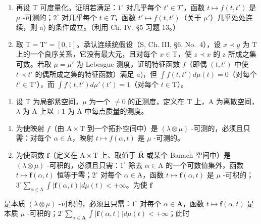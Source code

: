 \begin{enumerate}
\def\labelenumi{\alph{enumi})}
\setcounter{enumi}{1}
\item
  再设 T 可度量化。证明若满足：\(1^{\circ}\) 对几乎每个 \(t' \in T'\)，函数 \(t \mapsto f(t, t')\) 是 \(\mu\) -可测的；\(2^{\circ}\) 对几乎每个 \(t \in T\)，函数 \(t' \mapsto f(t, t')\)（关于 \(\mu'\)）几乎处处连续，则 a) 的条件成立。（利用 Ch. IV, §5 习题 13。）
\item
  取 \(\mathrm{T} = \mathrm{T}' = [0,1]\)。承认连续统假设（S, Ch. III, §6, No.~4），设 \(x \prec y\) 为 \(\mathrm{T}\) 上的一个良序关系，它没有最大元，且对每个 \(x \in \mathrm{T}\)，使 \(z \prec x\) 的 z 所成之集可数。若取 \(\mu = \mu'\) 为 Lebesgue 测度，证明特征函数 \(f\)（即偶 \((t, t')\) 中使 \(t \prec t'\) 的偶所成之集的特征函数）满足 \(a\))，但 \(\int f(t, t') d\mu(t) = 0\)（对每个 \(t' \in \mathrm{T}'\)），而 \(\int f(t, t') d\mu'(t') = 1\)（对每个 \(t \in \mathrm{T}\)）。
\end{enumerate}

\begin{enumerate}
\def\labelenumi{\arabic{enumi})}
\setcounter{enumi}{7}
\tightlist
\item
  设 \(\mathrm{T}\) 为局部紧空间，\(\mu\) 为一个 \(\neq 0\) 的正测度，定义在 \(\mathrm{T}\) 上，A 为离散空间，\(\lambda\) 为 \(\mathrm{A}\) 上以 \(+1\) 为 \(\mathrm{A}\) 中每点质量的测度。
\end{enumerate}

\begin{enumerate}
\def\labelenumi{\alph{enumi})}
\item
  为使映射 \(f\)（由 \(\mathrm{A} \times \mathrm{T}\) 到一个拓扑空间中）是 \((\lambda \otimes \mu)\) -可测的，必须且只需：对每个 \(\alpha \in \mathrm{A}\)，映射 \(t \mapsto f(\alpha, t)\) 是 \(\mu\) -可测的。
\item
  为使函数 \(\mathbf{f}\)（定义在 \(\mathrm{A} \times \mathrm{T}\) 上、取值于 \(\overline{\mathbf{R}}\) 或某个 Banach 空间中）是 \((\lambda \otimes \mu)\) -可积的，必须且只需：\(1^{\circ}\) 除去 \(\alpha \in \mathrm{A}\) 的一个可数值集外，函数 \(t \mapsto \mathbf{f}(\alpha, t)\) 恒等于零；\(2^{\circ}\) 对每个 \(\alpha \in \mathrm{A}\)，函数 \(t \mapsto \mathbf{f}(\alpha, t)\) 是 \(\mu\) -可积的；\(3^{\circ} \sum_{\alpha \in \mathrm{A}} \int |\mathbf{f}(\alpha, t)| d\mu(t) < +\infty\)。为使 \(\mathbf{f}\)
\end{enumerate}

是本质 \((\lambda \otimes \mu)\) -可积的，必须且只需：\(1^{\circ}\) 对每个 \(\alpha \in \mathbf{A}\)，函数 \(t \mapsto \mathbf{f}(\alpha, t)\) 是本质 \(\mu\) -可积的；\(2^{\circ} \sum_{\alpha \in \mathbf{A}} \int |\mathbf{f}(\alpha, t)| d\mu(t) < +\infty\)；此时

